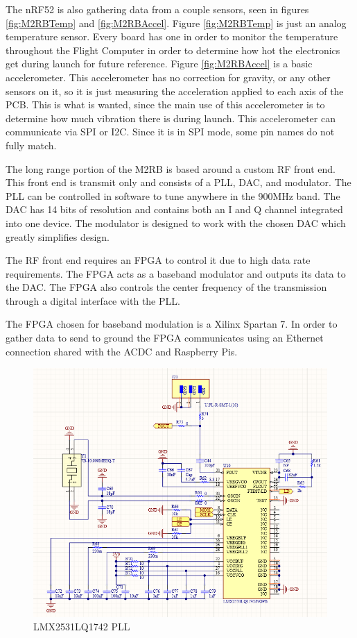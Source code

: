 \documentclass[crop=false]{standalone}
\begin{document}
        The nRF52 is also gathering data from a couple sensors, seen in figures \ref{fig:M2RBTemp} and \ref{fig:M2RBAccel}. Figure \ref{fig:M2RBTemp} is just an analog temperature sensor. Every board has one in order to monitor the temperature throughout the Flight Computer in order to determine how hot the electronics get during launch for future reference. Figure \ref{fig:M2RBAccel} is a basic accelerometer. This accelerometer has no correction for gravity, or any other sensors on it, so it is just measuring the acceleration applied to each axis of the PCB. This is what is wanted, since the main use of this accelerometer is to determine how much vibration there is during launch. This accelerometer can communicate via SPI or I2C. Since it is in SPI mode, some pin names do not fully match.
        
        \pagebreak
         
        The long range portion of the M2RB is based around a custom RF front end. This front end is transmit only and consists of a PLL, DAC, and modulator. The PLL can be controlled in software to tune anywhere in the 900MHz band. The DAC has 14 bits of resolution and contains both an I and Q channel integrated into one device. The modulator is designed to work with the chosen DAC which greatly simplifies design.
            
        The RF front end requires an FPGA to control it due to high data rate requirements. The FPGA acts as a baseband modulator and outputs its data to the DAC. The FPGA also controls the center frequency of the transmission through a digital interface with the PLL.
            
        The FPGA chosen for baseband modulation is a Xilinx Spartan 7. In order to gather data to send to ground the FPGA communicates using an Ethernet connection shared with the ACDC and Raspberry Pis.
            
        \begin{figure}[H]
            \centering
            \includegraphics[width=\textwidth]{M2RBPLL.PNG}
            \caption{LMX2531LQ1742 PLL}
            \label{fig:M2RBPLL}
        \end{figure}
            
\end{document}
